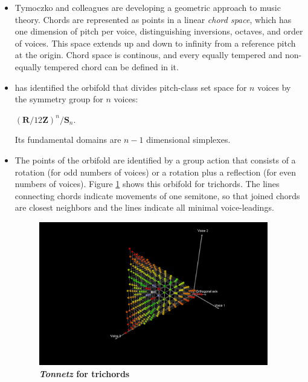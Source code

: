 \documentclass[14pt,letterpaper,onecolumn]{scrartcl}
\begin{document}
\begin{itemize}

\item Tymoczko and colleagues \cite{geometryofchords,generalizedchordspaces} are developing a geometric approach to music theory. Chords are represented as points in a linear \emph{chord space}, which has one dimension of pitch per voice, distinguishing inversions, octaves, and order of voices. This space extends up and down to infinity from a reference pitch at the origin. Chord space is continous, and every equally tempered and non-equally tempered chord can be defined in it.

\item \cite{geometryofchords} has identified the orbifold that divides pitch-class set space for $n$ voices by the symmetry group for $n$ voices: 

$\left(\textbf{R}/12\textbf{Z}\right)^{n}/\textbf{S}_{n}$. 

Its fundamental domains are $n - 1$ dimensional simplexes. 

\newpage

\item The points of the orbifold are identified by a group action that consists of a rotation (for odd numbers of voices) or a rotation plus a reflection (for even numbers of voices). Figure \ref{fig:tonnetzfortrichords} shows this orbifold for trichords. The lines connecting chords indicate movements of one semitone, so that joined chords are closest neighbors and the lines indicate all minimal voice-leadings. 

\begin{figure}[htbp]
	\centering
		\includegraphics[trim=370 120 170 35,width=10cm,clip]{tonnetzfortrichords} 
	\caption{\textbf{\emph{Tonnetz} for trichords}}
	\label{fig:tonnetzfortrichords}
\end{figure}


\end{itemize}
\end{document}
